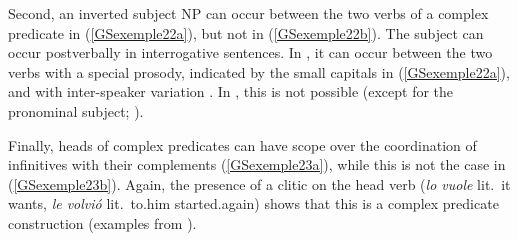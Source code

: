 	\label{GSexemple21c}	
\zl

\noindent
Second, an inverted subject NP can occur between the two verbs of a complex predicate in  (\ref{GSexemple22a}), but not in  (\ref{GSexemple22b}). The subject can occur postverbally in interrogative sentences. In , it can occur between the two verbs with a special prosody, indicated by the small capitals in (\ref{GSexemple22a}), and with inter-speaker variation \citep{salvi1980ausiliari}. In , this is not possible (except for the pronominal subject; \citealt{suner1982syntax}).

\eal
\judgewidth{\%}
	\label{GSexemple22} 
	\label{GSexemple22a}

	\label{GSexemple22b}		
	
	\label{GSexemple22c}	
\zl

\noindent
Finally,  heads of complex predicates can have scope over the coordination of infinitives with their complements (\ref{GSexemple23a}), while this is not the case in  (\ref{GSexemple23b}). Again, the presence of a clitic on the head verb (\emph{lo vuole} lit.\ it wants, \emph{le volvi\'o} lit.\ to.him started.again) shows that this is a complex predicate construction (examples from \citealt[136--137]{AG2010}).

\eal
\judgewidth{\%}
\label{GSexemple23}%
\label{GSexemple23a}

